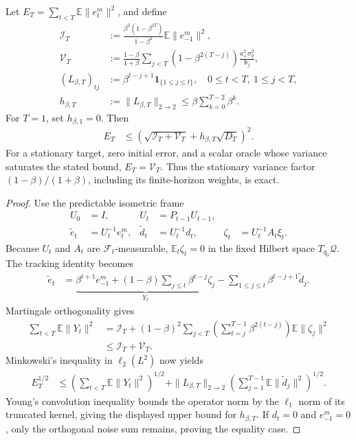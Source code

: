 \begin{theorem}
\label{thm:sharp-momentum-filter}
Let $E_T=\sum_{t<T}\mathbb E\|e_t^m\|^2$, and define
\begin{align}
 \mathcal I_T&:=\frac{\beta^2(1-\beta^{2T})}{1-\beta^2}
 \mathbb E\|e_{-1}^m\|^2,\\
 \mathcal V_T&:=\frac{1-\beta}{1+\beta}
 \sum_{j<T}(1-\beta^{2(T-j)})\frac{a_+^2\sigma_q^2}{\mathfrak b_j},\\
 (L_{\beta,T})_{tj}&:=\beta^{t-j+1}\mathbf1_{\{1\le j\le t\}},
 \quad 0\le t<T,\ 1\le j<T,\\
 h_{\beta,T}&:=\|L_{\beta,T}\|_{2\to2}
 \le\beta\sum_{k=0}^{T-2}\beta^k.
\end{align}
For $T=1$, set $h_{\beta,1}=0$. Then
\begin{align}\label{eq:sharp-momentum-filter}
 E_T&\le\left(\sqrt{\mathcal I_T+\mathcal V_T}
 +h_{\beta,T}\sqrt{D_T}\right)^2.
\end{align}
For a stationary target, zero initial error, and a scalar oracle whose variance saturates the stated bound, $E_T=\mathcal V_T$. Thus the stationary variance factor $(1-\beta)/(1+\beta)$, including its finite-horizon weights, is exact.
\end{theorem}
\begin{proof}
Use the predictable isometric frame
\begin{align}
 U_0&=I,&U_t&=P_{t-1}U_{t-1},\\
 \widetilde e_t&=U_t^{-1}e_t^m,&
 \widetilde d_t&=U_t^{-1}d_t,&
 \zeta_t&=U_t^{-1}A_t\xi_t.
\end{align}
Because $U_t$ and $A_t$ are $\mathcal F_t$-measurable, $\mathbb E_t\zeta_t=0$ in the fixed Hilbert space $T_{q_0}\mathcal Q$. The tracking identity becomes
\begin{align}
 \widetilde e_t
 &=\underbrace{\beta^{t+1}e_{-1}^m+
 (1-\beta)\sum_{j\le t}\beta^{t-j}\zeta_j}_{Y_t}
 -\sum_{1\le j\le t}\beta^{t-j+1}\widetilde d_j.
\end{align}
Martingale orthogonality \citep{williams1991martingales} gives
\begin{align}
 \sum_{t<T}\mathbb E\|Y_t\|^2
 &=\mathcal I_T+(1-\beta)^2\sum_{j<T}
 \left(\sum_{t=j}^{T-1}\beta^{2(t-j)}\right)\mathbb E\|\zeta_j\|^2\\
 &\le\mathcal I_T+\mathcal V_T.
\end{align}
Minkowski's inequality in $\ell_2(L^2)$ now yields
\begin{align}
 E_T^{1/2}
 &\le\left(\sum_{t<T}\mathbb E\|Y_t\|^2\right)^{1/2}
 +\|L_{\beta,T}\|_{2\to2}
 \left(\sum_{j=1}^{T-1}\mathbb E\|\widetilde d_j\|^2\right)^{1/2}.
\end{align}
Young's convolution inequality \citep{grafakos2014fourier} bounds the operator norm by the $\ell_1$ norm of its truncated kernel, giving the displayed upper bound for $h_{\beta,T}$. If $d_t=0$ and $e_{-1}^m=0$, only the orthogonal noise sum remains, proving the equality case.
\end{proof}

